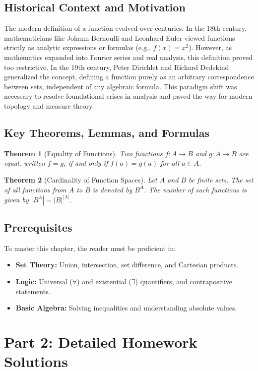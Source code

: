 \documentclass[11pt, a4paper]{article}
\newtheorem{theorem}{Theorem}[section]
\theoremstyle{definition}
\theoremstyle{remark}
\begin{document}
\subsection{Historical Context and Motivation}
The modern definition of a function evolved over centuries. In the 18th century, mathematicians like Johann Bernoulli and Leonhard Euler viewed functions strictly as analytic expressions or formulas (e.g., $f(x) = x^2$). However, as mathematics expanded into Fourier series and real analysis, this definition proved too restrictive. In the 19th century, Peter Dirichlet and Richard Dedekind generalized the concept, defining a function purely as an arbitrary correspondence between sets, independent of any algebraic formula. This paradigm shift was necessary to resolve foundational crises in analysis and paved the way for modern topology and measure theory.

\subsection{Key Theorems, Lemmas, and Formulas}
\begin{theorem}[Equality of Functions]
Two functions $f: A \to B$ and $g: A \to B$ are equal, written $f = g$, if and only if $f(a) = g(a)$ for all $a \in A$.
\end{theorem}

\begin{theorem}[Cardinality of Function Spaces]
Let $A$ and $B$ be finite sets. The set of all functions from $A$ to $B$ is denoted by $B^A$. The number of such functions is given by $|B^A| = |B|^{|A|}$.
\end{theorem}

\subsection{Prerequisites}
To master this chapter, the reader must be proficient in:
\begin{itemize}
    \item \textbf{Set Theory:} Union, intersection, set difference, and Cartesian products.
    \item \textbf{Logic:} Universal ($\forall$) and existential ($\exists$) quantifiers, and contrapositive statements.
    \item \textbf{Basic Algebra:} Solving inequalities and understanding absolute values.
\end{itemize}

\newpage
\section{Part 2: Detailed Homework Solutions}
\end{document}
